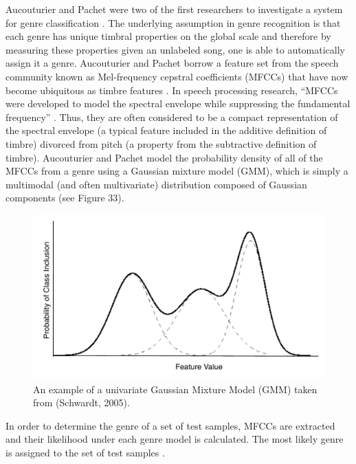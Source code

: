 \documentclass[12pt]{report} 	%
\numberwithin{figure}{chapter}
\numberwithin{table}{chapter}
\numberwithin{equation}{chapter}
\begin{document}
\begin{flushleft}
Aucouturier and Pachet were two of the first researchers to investigate a system for genre classification \cite{Aucouturier:2002gf}. The underlying assumption in genre recognition is that each genre has unique timbral properties on the global scale and therefore by measuring these properties given an unlabeled song, one is able to automatically assign it a genre. Aucouturier and Pachet borrow a feature set from the speech community known as Mel-frequency cepstral coefficients (MFCCs) that have now become ubiquitous as timbre features \cite[p. 1]{Aucouturier:2002gf}. In speech processing research, ``MFCCs were developed to model the spectral envelope while suppressing the fundamental frequency'' \cite[p. 1]{Jensen:2006dw}. Thus, they are often considered to be a compact representation of the spectral envelope (a typical feature included in the additive definition of timbre) divorced from pitch (a property from the subtractive definition of timbre). Aucouturier and Pachet model the probability density of all of the MFCCs from a genre using a Gaussian mixture model (GMM), which is simply a multimodal (and often multivariate) distribution composed of Gaussian components (see Figure 33). 
\begin{figure}[h!]
\vspace{24pt}
\begin{center}
\includegraphics[scale=0.70]{GMM}
\caption[Gaussian mixture models]{An example of a univariate Gaussian Mixture Model (GMM) taken from (Schwardt, 2005).}
\end{center}
\vspace{6pt}
\end{figure}
In order to determine the genre of a set of test samples, MFCCs are extracted and their likelihood under each genre model is calculated. The most likely genre is assigned to the set of test samples \cite[p. 2]{Aucouturier:2002gf}.


\end{flushleft}
\end{document}
